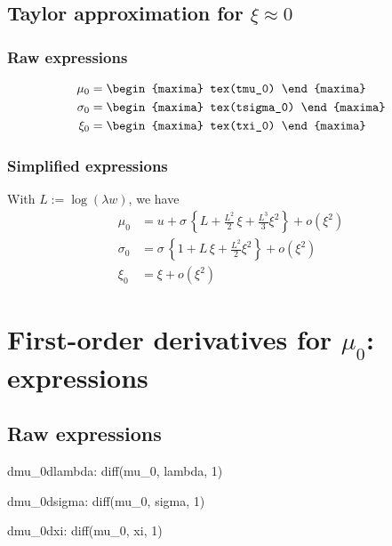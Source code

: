 \subsection{Taylor approximation for $\xi \approx 0$}

\subsubsection*{Raw expressions}

{\color{MonVertF}
\begin{align*}
\mu_0 &= 
\begin{maxima}
  tex(tmu_0)
\end{maxima} \\
\sigma_0 &= 
\begin{maxima}
  tex(tsigma_0)
\end{maxima}\\
  \xi_0 &= 
\begin{maxima}
  tex(txi_0)
\end{maxima}
\end{align*}
}

\subsubsection*{Simplified expressions}
With $L:= \log(\lambda w)$, we have
{\color{red}
\begin{align*}
  \mu_0 &= u + \sigma \, \left\{ L + \frac{L^2}{2} \,\xi + \frac{L^3}{3}\xi^2 \right\} + o(\xi^2) \\
  \sigma_0 &= \sigma \,  \left\{ 1 + L \,\xi + \frac{L^2}{2}\xi^2 \right\} + o(\xi^2) \\
  \xi_0 &= \xi + o(\xi^2)
\end{align*}
}


\section{First-order derivatives for $\mu_0$: expressions}

\subsection*{Raw expressions}

\begin{maxima}
  dmu_0dlambda: diff(mu_0, lambda, 1)
\end{maxima}
\begin{maxima}
  dmu_0dsigma: diff(mu_0, sigma, 1)
\end{maxima}
\begin{maxima}
  dmu_0dxi: diff(mu_0, xi, 1)
\end{maxima}

